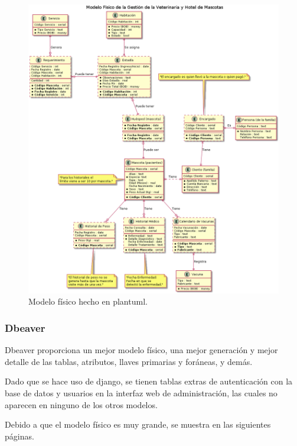 \documentclass[
  12pt,
  hidelinks,
  a4paper,
  headings=standardclasses,
  headings=big,
  spanish
]{scrartcl}
\begin{document}
\begin{figure}[H]
  \centering
  \includegraphics[width=\textwidth]{veterinaria_modelo_fisico.png}
  \caption{Modelo físico hecho en plantuml.}
\end{figure}

\subsubsection{Dbeaver}

Dbeaver proporciona un mejor modelo físico, una mejor generación y mejor detalle de las tablas, atributos, llaves primarias y foráneas, y demás.

Dado que se hace uso de django, se tienen tablas extras de autenticación con la base de datos y usuarios en la interfaz web de administración, las cuales no aparecen en ninguno de los otros modelos.

Debido a que el modelo físico es muy grande, se muestra en las siguientes páginas.
\end{document}
